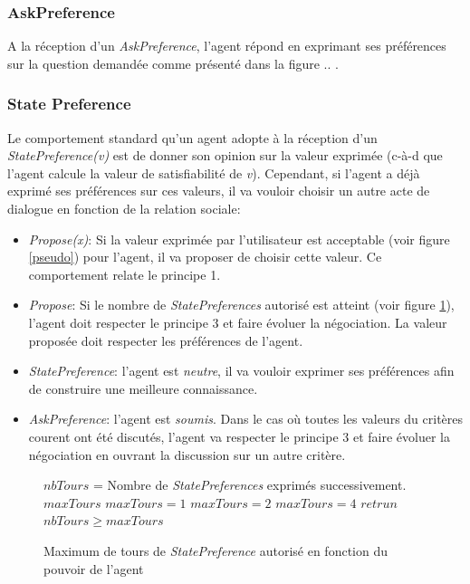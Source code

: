 	\subsubsection{AskPreference}
	A la réception d'un \emph{AskPreference}, l'agent répond en exprimant ses préférences sur la question demandée comme présenté dans la figure .. .
	
	\subsubsection{State Preference}
	Le comportement standard qu'un agent adopte à la réception d'un \emph{StatePreference(v)} est de donner son opinion sur la valeur exprimée (c-à-d que l'agent calcule la valeur de satisfiabilité de \textit{v}). Cependant, si l'agent a déjà exprimé ses préférences sur ces valeurs, il va vouloir choisir un autre acte de dialogue en fonction de la relation sociale:
	\begin{itemize}
		\item \emph{Propose(x)}: Si la valeur exprimée par l'utilisateur est acceptable (voir figure \ref{pseudo}) pour l'agent, il va proposer de choisir cette valeur. Ce comportement relate le principe 1.
		\item \emph{Propose}: Si le nombre de \emph{StatePreferences} autorisé est atteint (voir figure \ref{alg:maxtours}), l'agent doit respecter le principe 3 et faire évoluer la négociation. La valeur proposée doit respecter les préférences de l'agent. 
		\item \emph{StatePreference}: l'agent est \emph{neutre}, il va vouloir exprimer ses préférences afin de construire une meilleure connaissance.
		\item \emph{AskPreference}: l'agent est \emph{soumis}. Dans le cas où toutes les valeurs du critères courent ont été discutés, l'agent va respecter le principe 3 et faire évoluer la négociation en ouvrant la discussion sur un autre critère.
	\end{itemize}
	
	\begin{figure}[]
		\begin{algorithmic}[1]\small
			\State $nbTours$ = Nombre de \emph{StatePreferences} exprimés successivement.
			\State $maxTours$ 
			\State $maxTours = 1$
			\EndIf
			 \State $maxTours = 2$
			\EndIf
			\State $maxTours = 4$
			\EndIf
			\State $retrun$ $nbTours\geq maxTours$
			\EndFunction
		\end{algorithmic}
		\vskip 8pt
		\label{alg:maxtours}
		\caption{Maximum de tours de \emph{StatePreference} autorisé en fonction du pouvoir de l'agent}
	\end{figure} 
